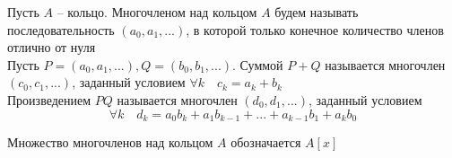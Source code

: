 \begin{definition}
	Пусть $A$ -- кольцо. Многочленом над кольцом $A$ будем называть последовательность $(a_0, a_1, ...)$, в которой только конечное количество членов отлично от нуля \\
	Пусть $P = (a_0, a_1, ...), Q = (b_0, b_1, ...)$. Суммой $P + Q$ называется многочлен $(c_0, c_1, ...)$, заданный условием $ \forall k \quad c_k = a_k + b_k $ \\
	Произведением $PQ$ называется многочлен $(d_0, d_1, ...)$, заданный условием
	$$ \forall k \quad d_k = a_0b_k + a_1b_{k - 1} + ... + a_{k - 1}b_1 + a_kb_0 $$
\end{definition}

\begin{notation}
	Множество многочленов над кольцом $A$ обозначается $A[x]$
\end{notation}

